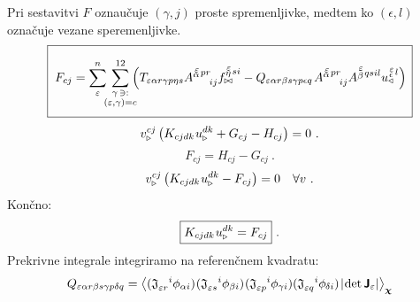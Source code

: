 \vspace{1mm}
Pri sestavitvi $F$ oznaučuje $(\gamma, j)$ proste spremenljivke, medtem ko $(\epsilon, l)$ označuje vezane speremenljivke.
\vspace{-1mm}
\begin{equation}
   \boxed{ \phantom{\rule[-9mm]{1mm}{18mm}}
   F_{c j} =
   \sum^n_\varepsilon
   \mkern-7mu
   \sum_{\substack{\gamma \, \ni: \\
      (\varepsilon,\gamma) = c}}^{12}
   \mkern-10mu
   \qty(
   T_{\varepsilon   \alpha r   \gamma p   \eta s}
   A^{\substack{\mkern2mu \varepsilon \\[-0.65mm] \alpha} \mkern2mu p r}_{\mkern29mu i j}
   f^{\substack{\mkern2mu \varepsilon \\[-0.59mm] \eta} \mkern2mu s i}_{\bowtie}
   -
   Q_{\varepsilon   \alpha r   \beta s   \gamma p   \epsilon q} \mkern2mu
   A^{\substack{\mkern2mu \varepsilon \\[-0.65mm] \alpha} \mkern2mu p r}_{\mkern29mu i j}
   A^{\substack{\mkern2mu \varepsilon \\[0.05mm] \beta} \mkern2mu q s i l}
   u^{\substack{\mkern2mu \varepsilon \\[-0.55mm] \epsilon} \mkern2mu l}_\triangleleft ) \mkern3mu }
\end{equation}
\begin{equation*}
   v^{c j}_{\triangleright} \left(
   K_{c j d k} \mkern1mu u^{d k}_\triangleright
   +
   G_{c j}
   -
   H_{c j}
   \right) = 0 \ .
\end{equation*}
\begin{equation*}
   F_{c j} = H_{c j} - G_{c j} \ .
\end{equation*}
\begin{equation*}
   v^{c j}_{\triangleright} \left(
   K_{c j d k} \mkern1mu u^{d k}_\triangleright
   -
   F_{c j}
   \right) = 0 \quad \forall v \ .
\end{equation*}
Končno:
\begin{equation}
   \boxed{
   K_{c j d k} \mkern1mu u^{d k}_\triangleright
   =
   F_{c j} } \ .
\end{equation}
Prekrivne integrale integriramo na referenčnem kvadratu:
\begin{equation}
   Q_{\varepsilon  \alpha r \beta s \gamma p \delta q}
   =
   \expval{
      ( \mathfrak{J}_{\varepsilon r}^{\mkern18mu i} \phi_{\alpha i}) \mkern1mu
      ( \mathfrak{J}_{\varepsilon s}^{\mkern18mu i} \phi_{\beta i} ) \mkern1mu
      ( \mathfrak{J}_{\varepsilon p}^{\mkern18mu i} \phi_{\gamma i})
      ( \mathfrak{J}_{\varepsilon q}^{\mkern18mu i} \phi_{\mkern-1mu \delta i} ) \mkern2mu
      |\mkern-2mu \det \bm{\mathsf{J}}_\varepsilon | }_{\bm{\chi}}
\end{equation}
